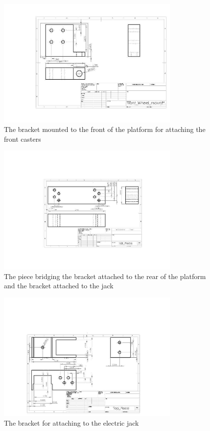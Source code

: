 \begin{figure}
\centering
 \includegraphics[width=0.8\textwidth]{images/Front_Wheel_mount}
\caption{The bracket mounted to the front of the platform for attaching the front casters}
\label{fig:front_bracket}
\end{figure}

\begin{figure}
\centering
 \includegraphics[width=0.8\textwidth]{images/Tall_Piece}
\caption{The piece bridging the bracket attached to the rear of the platform and the bracket attached to the jack}
\label{fig:tall_piece}
\end{figure}

\begin{figure}
\centering
 \includegraphics[width=0.8\textwidth]{images/Top_Piece}
\caption{The bracket for attaching to the electric jack}
\label{fig:top_piece}
\end{figure}


